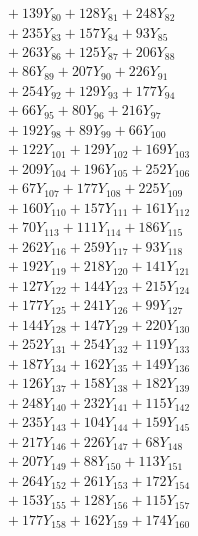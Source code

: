 \documentclass[a4paper,10pt]{article}
\begin{document}
{\begin{align}
&\;  + 139 Y_{80} + 128 Y_{81} + 248 Y_{82} \\[0.3ex]
&\;  + 235 Y_{83} + 157 Y_{84} + 93 Y_{85} \\[0.3ex]
&\;  + 263 Y_{86} + 125 Y_{87} + 206 Y_{88} \\[0.5ex]\allowbreak
&\;  + 86 Y_{89} + 207 Y_{90} + 226 Y_{91} \\[0.3ex]
&\;  + 254 Y_{92} + 129 Y_{93} + 177 Y_{94} \\[0.3ex]
&\;  + 66 Y_{95} + 80 Y_{96} + 216 Y_{97} \\[0.3ex]
&\;  + 192 Y_{98} + 89 Y_{99} + 66 Y_{100} \\[0.3ex]
&\;  + 122 Y_{101} + 129 Y_{102} + 169 Y_{103} \\[0.3ex]
&\;  + 209 Y_{104} + 196 Y_{105} + 252 Y_{106} \\[0.3ex]
&\;  + 67 Y_{107} + 177 Y_{108} + 225 Y_{109} \\[0.3ex]
&\;  + 160 Y_{110} + 157 Y_{111} + 161 Y_{112} \\[0.3ex]
&\;  + 70 Y_{113} + 111 Y_{114} + 186 Y_{115} \\[0.3ex]
&\;  + 262 Y_{116} + 259 Y_{117} + 93 Y_{118} \\[0.5ex]\allowbreak
&\;  + 192 Y_{119} + 218 Y_{120} + 141 Y_{121} \\[0.3ex]
&\;  + 127 Y_{122} + 144 Y_{123} + 215 Y_{124} \\[0.3ex]
&\;  + 177 Y_{125} + 241 Y_{126} + 99 Y_{127} \\[0.3ex]
&\;  + 144 Y_{128} + 147 Y_{129} + 220 Y_{130} \\[0.3ex]
&\;  + 252 Y_{131} + 254 Y_{132} + 119 Y_{133} \\[0.3ex]
&\;  + 187 Y_{134} + 162 Y_{135} + 149 Y_{136} \\[0.3ex]
&\;  + 126 Y_{137} + 158 Y_{138} + 182 Y_{139} \\[0.3ex]
&\;  + 248 Y_{140} + 232 Y_{141} + 115 Y_{142} \\[0.3ex]
&\;  + 235 Y_{143} + 104 Y_{144} + 159 Y_{145} \\[0.3ex]
&\;  + 217 Y_{146} + 226 Y_{147} + 68 Y_{148} \\[0.5ex]\allowbreak
&\;  + 207 Y_{149} + 88 Y_{150} + 113 Y_{151} \\[0.3ex]
&\;  + 264 Y_{152} + 261 Y_{153} + 172 Y_{154} \\[0.3ex]
&\;  + 153 Y_{155} + 128 Y_{156} + 115 Y_{157} \\[0.3ex]
&\;  + 177 Y_{158} + 162 Y_{159} + 174 Y_{160} \\[0.3ex]

\end{align}}
\end{document}
